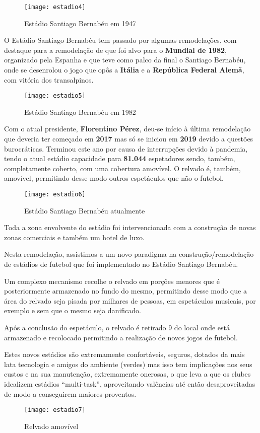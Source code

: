 \documentclass{report}
\begin{document}
\begin{figure}[h]
    \centering
    \texttt{[image: estadio4]}
    \caption{Estádio Santiago Bernabéu em 1947}
    \label{fig:estadio4}
\end{figure}

O Estádio Santiago Bernabéu tem passado por algumas remodelações, com destaque para a remodelação de que foi alvo para o \textbf{Mundial de 1982}, organizado pela Espanha e que teve como palco da final o Santiago Bernabéu, onde se desenrolou o jogo que opôs a \textbf{Itália} e a \textbf{República Federal Alemã}, com vitória dos transalpinos.
\begin{figure}[h]
    \centering
    \texttt{[image: estadio5]}
    \caption{Estádio Santiago Bernabéu em 1982}
    \label{fig:estadio5}
\end{figure}

Com o atual presidente, \textbf{Florentino Pérez}, deu-se início à última remodelação que deveria ter começado em \textbf{2017} mas só se iniciou em \textbf{2019} devido a questões burocráticas. Terminou este ano por causa de interrupções devido à pandemia, tendo o atual estádio capacidade para \textbf{81.044} espetadores sendo, também, completamente coberto, com uma cobertura amovível. O relvado é, também, amovível, permitindo desse modo outros espetáculos que não o futebol.
\begin{figure}[h]
    \centering
    \texttt{[image: estadio6]}
    \caption{Estádio Santiago Bernabéu atualmente}
    \label{fig:estadio6}
\end{figure}
Toda a zona envolvente do estádio foi intervencionada com a construção de novas zonas comerciais e também um hotel de luxo. 

Nesta remodelação, assistimos a um novo paradigma na construção/remodelação de estádios de futebol que foi implementado no Estádio Santiago Bernabéu. 

Um complexo mecanismo recolhe o relvado em porções menores que é posteriormente armazenado no fundo do mesmo, permitindo desse modo que a área do relvado seja pisada por milhares de pessoas, em espetáculos musicais, por exemplo e sem que o mesmo seja danificado.

Após a conclusão do espetáculo, o relvado é retirado 9 do local onde está armazenado e recolocado permitindo a realização de novos jogos de futebol.

Estes novos estádios são extremamente confortáveis, seguros, dotados da mais lata tecnologia e amigos do ambiente (verdes) mas isso tem implicações nos seus custos e na sua manutenção, extremamente onerosas, o que leva a que os clubes idealizem estádios “multi-task”, aproveitando valências até então desaproveitadas de modo a conseguirem maiores proventos.
\begin{figure}[h]
    \centering
    \texttt{[image: estadio7]}
    \caption{Relvado amovível}
    \label{fig:estadio7}
\end{figure}
\end{document}
